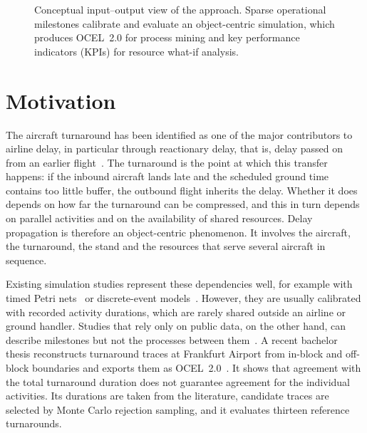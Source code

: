 \begin{figure}[htbp]
\caption{Conceptual input--output view of the approach. Sparse operational milestones calibrate and evaluate an object-centric simulation, which produces OCEL~2.0 for process mining and key performance indicators (KPIs) for resource what-if analysis.}
\label{fig:inputoutput}
\end{figure}

\section{Motivation}
\label{sec:motivation}

The aircraft turnaround has been identified as one of the major contributors to airline delay, in particular through reactionary delay, that is, delay passed on from an earlier flight~\cite{evler2021recovery}. The turnaround is the point at which this transfer happens: if the inbound aircraft lands late and the scheduled ground time contains too little buffer, the outbound flight inherits the delay. Whether it does depends on how far the turnaround can be compressed, and this in turn depends on parallel activities and on the availability of shared resources. Delay propagation is therefore an object-centric phenomenon. It involves the aircraft, the turnaround, the stand and the resources that serve several aircraft in sequence.

Existing simulation studies represent these dependencies well, for example with timed Petri nets~\cite{sng2019petri,cui2024ttpn} or discrete-event models~\cite{tang2024covid,purohit2026intact}. However, they are usually calibrated with recorded activity durations, which are rarely shared outside an airline or ground handler. Studies that rely only on public data, on the other hand, can describe milestones but not the processes between them~\cite{schultz2021adsb}. A recent bachelor thesis reconstructs turnaround traces at Frankfurt Airport from in-block and off-block boundaries and exports them as OCEL~2.0~\cite{tkacenko2026}. It shows that agreement with the total turnaround duration does not guarantee agreement for the individual activities. Its durations are taken from the literature, candidate traces are selected by Monte Carlo rejection sampling, and it evaluates thirteen reference turnarounds.

